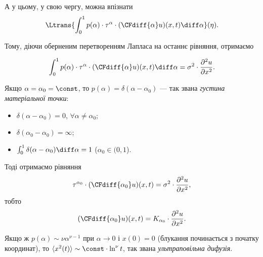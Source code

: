 А у цьому, у свою чергу, можна впізнати
\begin{equation}
    \Ltrans{\int_0^1 p(\alpha) \cdot \tau^\alpha \cdot (\CFdiff{\alpha} u)(x, t) \diff \alpha }(\eta).
\end{equation}

Тому, діючи оберненим перетворенням Лапласа на останнє рівняння, отримаємо
\begin{th_equation}
    \nothing
    \begin{equation}
        \int_0^1 p(\alpha) \cdot \tau^\alpha \cdot (\CFdiff{\alpha} u)(x, t) \diff \alpha = \sigma^2 \cdot \frac{\partial^2 u}{\partial x^2}.
    \end{equation}
\end{th_equation}

\begin{example}
    Якщо $\alpha = \alpha_0 = \const$, то $p(\alpha) = \delta(\alpha - \alpha_0)$ --- так звана \textit{густина матеріальної точки}:
    \begin{itemize}
        \item $\delta (\alpha - \alpha_0) = 0$, $\forall \alpha \ne \alpha_0$;
        \item $\delta (\alpha_0 - \alpha_0) = \infty$;
        \item $\int_0^1 \delta(\alpha - \alpha_0) \diff \alpha = 1$ ($\alpha_0 \in (0, 1$).
    \end{itemize}    
    
    Тоді отримаємо рівняння
    \begin{equation}
        \tau^{\alpha_0} \cdot (\CFdiff{\alpha_0} u)(x, t) = \sigma^2 \cdot \frac{\partial^2 u}{\partial x^2},
    \end{equation}
    тобто
    \begin{equation}
        (\CFdiff{\alpha_0} u)(x, t) = K_{\alpha_0} \cdot \frac{\partial^2 u}{\partial x^2}.
    \end{equation}
\end{example}

\begin{example}
    Якщо ж $p(\alpha) \sim \nu \alpha^{\nu - 1}$ при $\alpha \to 0$ і $x(0) = 0$ (блукання починається з початку координат), то $\langle x^2(t) \rangle \sim \const \cdot \ln^\nu t$, так звана \textit{ультраповільна дифузія}.
\end{example}

